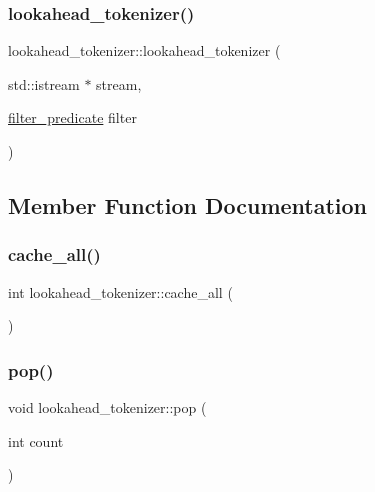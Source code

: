 \subsubsection{\texorpdfstring{lookahead\_tokenizer()}{lookahead\_tokenizer()}\hspace{0.1cm}{\footnotesize\ttfamily [2/2]}}
{\footnotesize\ttfamily lookahead\+\_\+tokenizer\+::lookahead\+\_\+tokenizer (\begin{DoxyParamCaption}\item[{std\+::istream $\ast$}]{stream,  }\item[{\mbox{\hyperlink{classlookahead__tokenizer_aa661c2cf70b109f34b64c9d910d6bd9e}{filter\+\_\+predicate}}}]{filter }\end{DoxyParamCaption})\hspace{0.3cm}{\ttfamily [inline]}}



\subsection{Member Function Documentation}
\mbox{\label{classlookahead__tokenizer_a876641e4468cffe0bd931fe640f1ea9e}} 
\subsubsection{\texorpdfstring{cache\_all()}{cache\_all()}}
{\footnotesize\ttfamily int lookahead\+\_\+tokenizer\+::cache\+\_\+all (\begin{DoxyParamCaption}{ }\end{DoxyParamCaption})}

\mbox{\label{classlookahead__tokenizer_a32f1b0097babb1211d9538e18c81ceb2}} 
\subsubsection{\texorpdfstring{pop()}{pop()}\hspace{0.1cm}{\footnotesize\ttfamily [1/2]}}
{\footnotesize\ttfamily void lookahead\+\_\+tokenizer\+::pop (\begin{DoxyParamCaption}\item[{int}]{count }\end{DoxyParamCaption})}

